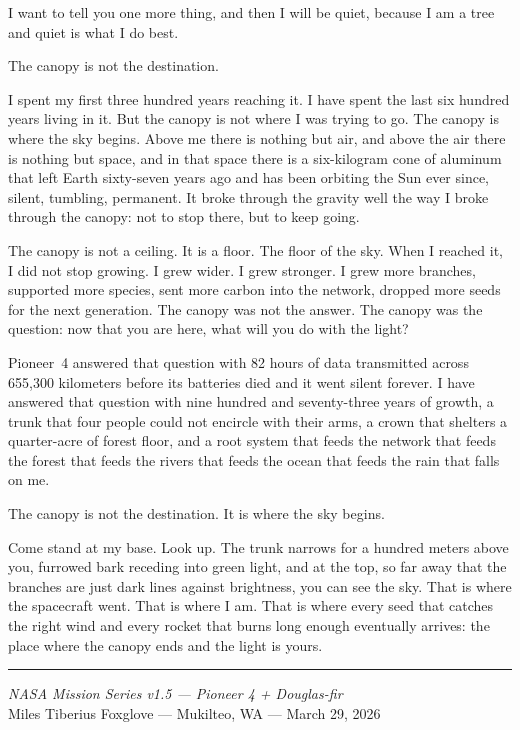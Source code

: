 \documentclass[12pt, letterpaper]{article}
\begin{document}
I want to tell you one more thing, and then I will be quiet, because I am a tree and quiet is what I do best.

The canopy is not the destination.

I spent my first three hundred years reaching it. I have spent the last six hundred years living in it. But the canopy is not where I was trying to go. The canopy is where the sky begins. Above me there is nothing but air, and above the air there is nothing but space, and in that space there is a six-kilogram cone of aluminum that left Earth sixty-seven years ago and has been orbiting the Sun ever since, silent, tumbling, permanent. It broke through the gravity well the way I broke through the canopy: not to stop there, but to keep going.

The canopy is not a ceiling. It is a floor. The floor of the sky. When I reached it, I did not stop growing. I grew wider. I grew stronger. I grew more branches, supported more species, sent more carbon into the network, dropped more seeds for the next generation. The canopy was not the answer. The canopy was the question: now that you are here, what will you do with the light?

Pioneer~4 answered that question with 82 hours of data transmitted across 655,300 kilometers before its batteries died and it went silent forever. I have answered that question with nine hundred and seventy-three years of growth, a trunk that four people could not encircle with their arms, a crown that shelters a quarter-acre of forest floor, and a root system that feeds the network that feeds the forest that feeds the rivers that feeds the ocean that feeds the rain that falls on me.

The canopy is not the destination. It is where the sky begins.

Come stand at my base. Look up. The trunk narrows for a hundred meters above you, furrowed bark receding into green light, and at the top, so far away that the branches are just dark lines against brightness, you can see the sky. That is where the spacecraft went. That is where I am. That is where every seed that catches the right wind and every rocket that burns long enough eventually arrives: the place where the canopy ends and the light is yours.

\vspace{2em}
\begin{center}
\rule{3cm}{0.4pt}
\end{center}
\vspace{1em}

\begin{center}
\small\textit{NASA Mission Series v1.5 --- Pioneer 4 + Douglas-fir}\\
\small Miles Tiberius Foxglove --- Mukilteo, WA --- March 29, 2026
\end{center}
\end{document}

